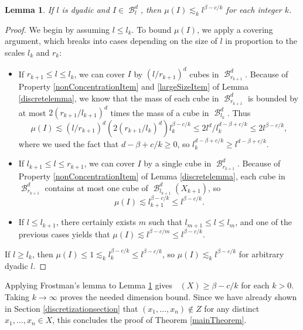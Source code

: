 \documentclass[dvipsnames,letterpaper,12pt]{article}
\numberwithin{equation}{section}
\theoremstyle{plain}
\newtheorem{lemma}{Lemma}
\DeclareMathOperator{\hausdim}{\dim_{\mathbf{H}}}
\DeclareMathOperator{\B}{\mathcal{B}}
\begin{document}
\begin{lemma} \label{frostmanBound}
	If $l$ is dyadic and $I \in \B_l^d$, then $\mu(I) \lesssim_k l^{\beta - c/k}$ for each integer $k$.
\end{lemma}
\begin{proof}
	We begin by assuming $l \leq l_k$. To bound $\mu(I)$, we apply a covering argument, which breaks into cases depending on the size of $l$ in proportion to the scales $l_k$ and $r_k$:
	\begin{itemize}
		\item If $r_{k+1} \leq l \leq l_k$, we can cover $I$ by $(l/r_{k+1})^d$ cubes in $\B^d_{r_{k+1}}$. Because of Property \ref{nonConcentrationItem} and \ref{largeSizeItem} of Lemma \ref{discretelemma}, we know that the mass of each cube in $\B^d_{r_{k+1}}$ is bounded by at most $2 (r_{k+1}/l_{k+1})^d$ times the mass of a cube in $\B_{l_k}^d$. Thus
		\[ \mu(I) \lesssim (l/r_{k+1})^d (2(r_{k+1}/l_k)^d) l_k^{\beta - c/k} \leq 2l^d/l_k^{d - \beta + c/k} \leq 2l^{\beta - c/k}, \]
		where we used the fact that $d - \beta + c/k \geq 0$, so $l_k^{d - \beta + c/k} \geq l^{d - \beta + c/k}$.

		\item If $l_{k+1} \leq l \leq r_{k+1}$, we can cover $I$ by a single cube in $\B^d_{r_{k+1}}$. Because of Property \ref{nonConcentrationItem} of Lemma \ref{discretelemma}, each cube in $\B^d_{r_{k+1}}$ contains at most one cube of $\B^d_{l_{k+1}}(X_{k+1})$, so
		\[ \mu(I) \lesssim l_{k+1}^{\beta - c/k} \leq l^{\beta - c/k}. \]

		\item If $l \leq l_{k+1}$, there certainly exists $m$ such that $l_{m+1} \leq l \leq l_m$, and one of the previous cases yields that $\mu(I) \lesssim l^{\beta - c/m} \leq l^{\beta - c/k}$.
	\end{itemize}
	If $l \geq l_k$, then $\mu(I) \leq 1 \lesssim_k l_k^{\beta - c/k} \leq l^{\beta - c/k}$, so $\mu(I) \lesssim_k l^{\beta - c/k}$ for arbitrary dyadic $l$.
\end{proof}

Applying Frostman's lemma to Lemma \ref{frostmanBound} gives $\hausdim(X) \geq \beta - c/k$ for each $k > 0$. Taking $k \to \infty$ proves the needed dimension bound. Since we have already shown in Section \ref{discretizationsection} that $(x_1, \dots, x_n) \not \in Z$ for any distinct $x_1, \dots, x_n \in X$, this concludes the proof of Theorem \ref{mainTheorem}.
\end{document}
